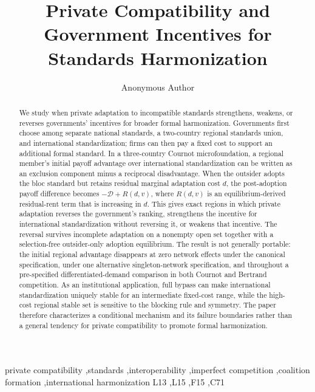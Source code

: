 \documentclass[review,authoryear]{elsarticle}
\begin{document}
\begin{frontmatter}

\title{Private Compatibility and Government Incentives for Standards Harmonization}

\author{Anonymous Author}

\begin{abstract}
We study when private adaptation to incompatible standards strengthens, weakens, or reverses governments' incentives for broader formal harmonization. Governments first choose among separate national standards, a two-country regional standards union, and international standardization; firms can then pay a fixed cost to support an additional formal standard. In a three-country Cournot microfoundation, a regional member's initial payoff advantage over international standardization can be written as an exclusion component minus a reciprocal disadvantage. When the outsider adopts the bloc standard but retains residual marginal adaptation cost $d$, the post-adoption payoff difference becomes $-\mathscr D+R(d,v)$, where $R(d,v)$ is an equilibrium-derived residual-rent term that is increasing in $d$. This gives exact regions in which private adaptation reverses the government's ranking, strengthens the incentive for international standardization without reversing it, or weakens that incentive. The reversal survives incomplete adaptation on a nonempty open set together with a selection-free outsider-only adoption equilibrium. The result is not generally portable: the initial regional advantage disappears at zero network effects under the canonical specification, under one alternative singleton-network specification, and throughout a pre-specified differentiated-demand comparison in both Cournot and Bertrand competition. As an institutional application, full bypass can make international standardization uniquely stable for an intermediate fixed-cost range, while the high-cost regional stable set is sensitive to the blocking rule and symmetry. The paper therefore characterizes a conditional mechanism and its failure boundaries rather than a general tendency for private compatibility to promote formal harmonization.
\end{abstract}

\begin{keyword}
private compatibility \sep standards \sep interoperability \sep imperfect competition \sep coalition formation \sep international harmonization
\JEL L13 \sep L15 \sep F15 \sep C71
\end{keyword}

\end{frontmatter}
\end{document}
